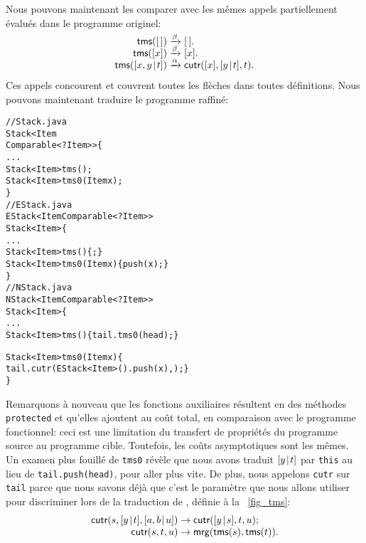 Nous pouvons maintenant les comparer avec les mêmes appels
partiellement évalués dans le programme originel:
\begin{equation*}
\begin{array}{@{}r@{\;}l@{\;}l@{}}
\fun{tms}(\el) & \xrightarrow{\smash{\beta}} & \el.\\
\fun{tms}([x]) & \xrightarrow{\smash{\beta}} & [x].\\
\fun{tms}(\cons{x,y}{t}) & \xrightarrow{\smash{\alpha}}
                         & \fun{cutr}([x],\cons{y}{t},t).
\end{array}
\end{equation*}
Ces appels concourent et couvrent toutes les flèches dans toutes
définitions. Nous pouvons maintenant traduire le programme
raffiné:
\begin{alltt}
// Stack.java
\public \abstractX \class Stack<Item
\hfill\extends Comparable<? \super Item>> \{
  ...
  \public \abstractX Stack<Item> tms();
  \protectedX \abstractX Stack<Item> tms0(\final Item x);
\}
// EStack.java
\public \class EStack<Item \extends Comparable<? \super Item>> 
       \extends Stack<Item> \{
  ...
  \public Stack<Item> tms() \{ \return \this; \}
  \protectedX Stack<Item> tms0(\final Item x) \{\return push(x);\}
\}
// NStack.java
\public \class NStack<Item \extends Comparable<? \super Item>>
       \extends Stack<Item> \{
  ...
  \public Stack<Item> tms() \{ \return tail.tms0(head); \}

  \protectedX Stack<Item> tms0(\final Item x) \{
    \return tail.cutr(\new EStack<Item>().push(x),\this); \}
\}
\end{alltt}
Remarquons à nouveau que les fonctions auxiliaires résultent en des
méthodes \texttt{protected} et qu'elles ajoutent au coût total, en
comparaison avec le programme fonctionnel: ceci est une limitation du
transfert de propriétés du programme source au programme
cible. Toutefois, les coûts asymptotiques sont les mêmes. Un examen
plus fouillé de \texttt{tms0} révèle que nous avons traduit
\([{y}\!\mid\!{t}]\) par \texttt{this} au lieu de \texttt{tail.push(head)},
pour aller plus vite. De plus, nous appelons \texttt{cutr} sur
\texttt{tail} parce que nous savons déjà que c'est le paramètre que
nous allons utiliser pour discriminer lors de la traduction de
, définie à la \fig~\vref{fig_tms}:
\begin{equation*}
\begin{array}{@{}r@{\;}l@{\;}l@{}}
\fun{cutr}(s,\cons{y}{t},\cons{a,b}{u})
                       & \rightarrow & \fun{cutr}(\cons{y}{s},t,u);\\
\fun{cutr}(s,t,u)      & \rightarrow 
                       & \fun{mrg}(\fun{tms}(s),\fun{tms}(t)).
\end{array}
\end{equation*}
